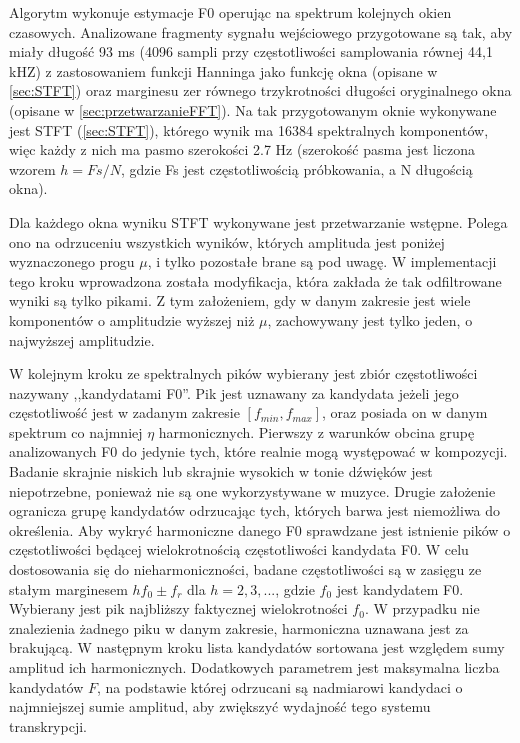 \documentclass[12pt,a4paper,twoside]{mwart}
\begin{document}
Algorytm wykonuje estymacje F0 operując na spektrum kolejnych okien czasowych. Analizowane fragmenty sygnału wejściowego przygotowane są tak, aby miały długość 93 ms (4096 sampli przy częstotliwości samplowania równej 44,1 kHZ) z zastosowaniem funkcji Hanninga jako funkcję okna (opisane w \ref{sec:STFT}) oraz marginesu zer równego trzykrotności długości oryginalnego okna (opisane w \ref{sec:przetwarzanieFFT}). Na tak przygotowanym oknie wykonywane jest STFT (\ref{sec:STFT}), którego wynik ma 16384 spektralnych komponentów, więc każdy z nich ma pasmo szerokości 2.7 Hz (szerokość pasma jest liczona wzorem $h = Fs / N$, gdzie Fs jest częstotliwością próbkowania, a N długością okna).

Dla każdego okna wyniku STFT wykonywane jest przetwarzanie wstępne. Polega ono na odrzuceniu wszystkich wyników, których amplituda jest poniżej wyznaczonego progu $\mu$, i tylko pozostałe brane są pod uwagę. W implementacji tego kroku wprowadzona została modyfikacja, która zakłada że tak odfiltrowane wyniki są tylko pikami. Z tym założeniem, gdy w danym zakresie jest wiele komponentów o amplitudzie wyższej niż $\mu$, zachowywany jest tylko jeden, o najwyższej amplitudzie.

W kolejnym kroku ze spektralnych pików wybierany jest zbiór częstotliwości nazywany ,,kandydatami F0''. Pik jest uznawany za kandydata jeżeli jego częstotliwość jest w zadanym zakresie $[f_{min}, f_{max}]$, oraz posiada on w danym spektrum co najmniej $\eta$ harmonicznych. Pierwszy z warunków obcina grupę analizowanych F0 do jedynie tych, które realnie mogą występować w kompozycji. Badanie skrajnie niskich lub skrajnie wysokich w tonie dźwięków jest niepotrzebne, ponieważ nie są one wykorzystywane w muzyce. Drugie założenie ogranicza grupę kandydatów odrzucając tych, których barwa jest niemożliwa do określenia. Aby wykryć harmoniczne danego F0 sprawdzane jest istnienie pików o częstotliwości będącej wielokrotnością częstotliwości kandydata F0. W celu dostosowania się do nieharmoniczności, badane częstotliwości są w zasięgu ze stałym marginesem $hf_0 \pm f_r$ dla $h = 2, 3, ...$, gdzie $f_0$ jest kandydatem F0. Wybierany jest pik najbliższy faktycznej wielokrotności $f_0$. W przypadku nie znalezienia żadnego piku w danym zakresie, harmoniczna uznawana jest za brakującą. W następnym kroku lista kandydatów sortowana jest względem sumy amplitud ich harmonicznych. Dodatkowych parametrem jest maksymalna liczba kandydatów $F$, na podstawie której odrzucani są nadmiarowi kandydaci o najmniejszej sumie amplitud, aby zwiększyć wydajność tego systemu transkrypcji.
\end{document}
